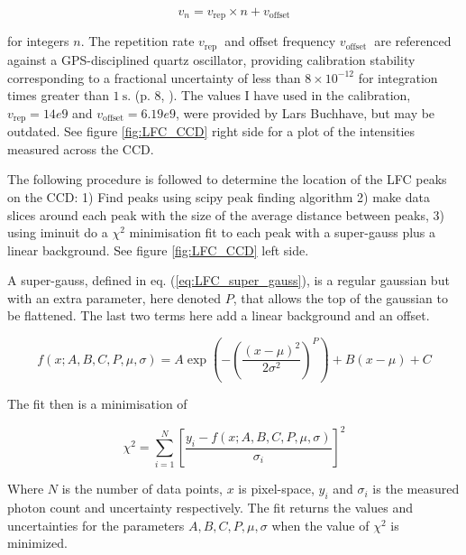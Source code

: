     \begin{equation}
        \label{eq:LFC_freq_eq}
        v_{n}=v_{\text{rep}} \times n+v_{\text{offset}}
    \end{equation}

    for integers $n$. The repetition rate $v_{\text {rep }}$ and offset frequency $v_{\text {offset }}$ are referenced against a GPS-disciplined quartz oscillator, providing calibration stability corresponding to a fractional uncertainty of less than $8 \times 10^{-12}$ for integration times greater than $1 \mathrm{~s}$. (p. 8, \cite{first_RV_from_EXPRES}). The values I have used in the calibration, $v_{\text{rep}} = 14e9$ and $v_{\text{offset}} = 6.19e9$, were provided by Lars Buchhave, but may be outdated. See figure \ref{fig:LFC_CCD} right side for a plot of the intensities measured across the CCD.

    The following procedure is followed to determine the location of the LFC peaks on the CCD: 1) Find peaks using scipy peak finding algorithm 2) make data slices around each peak with the size of the average distance between peaks, 3) using iminuit do a $\chi^2$ minimisation fit to each peak with a super-gauss plus a linear background. See figure \ref{fig:LFC_CCD} left side.

    A super-gauss, defined in eq. (\ref{eq:LFC_super_gauss}), is a regular gaussian but with an extra parameter, here denoted $P$, that allows the top of the gaussian to be flattened. The last two terms here add a linear background and an offset. 
    
    \begin{equation}
        \label{eq:LFC_super_gauss}
        f(x ; A, B, C, P, \mu, \sigma) = A \exp \left(-\left(\frac{\left(x-\mu\right)^{2}}{2 \sigma^{2}}\right)^{P}\right) + B(x-\mu) + C
    \end{equation}

    The fit then is a minimisation of  

    \begin{equation}
        \label{eq:chi2_super_gauss}
        \chi^{2}=\sum_{i=1}^{N}\left[\frac{y_{i}-f(x ; A, B, C, P, \mu, \sigma)}{\sigma_{i}}\right]^{2}
    \end{equation}

    Where $N$ is the number of data points, $x$ is pixel-space, $y_i$ and $\sigma_i$ is the measured photon count and uncertainty respectively. The fit returns the values and uncertainties for the parameters $A, B, C, P, \mu, \sigma$ when the value of $\chi^2$ is minimized.
    

